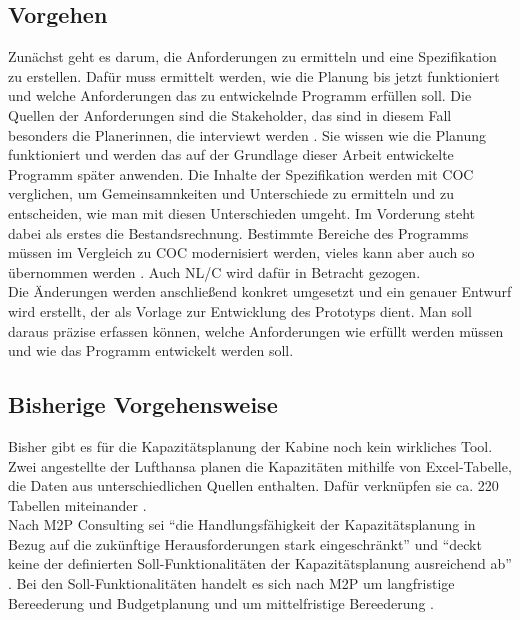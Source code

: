 \documentclass [12pt, a4paper, oneside, titlepage, ngerman]{article}
\begin{document}
\subsection {Vorgehen}
Zunächst geht es darum, die Anforderungen zu ermitteln und eine Spezifikation zu erstellen. Dafür muss ermittelt werden, wie die Planung bis jetzt funktioniert und welche Anforderungen das zu entwickelnde Programm erfüllen soll. Die Quellen der Anforderungen sind die Stakeholder, das sind in diesem Fall besonders die Planerinnen, die interviewt werden . Sie wissen wie die Planung funktioniert und werden das auf der Grundlage dieser Arbeit entwickelte Programm später anwenden. Die Inhalte der Spezifikation werden mit \ac{COC} verglichen, um Gemeinsamnkeiten und Unterschiede zu ermitteln und zu entscheiden, wie man mit diesen  Unterschieden umgeht. Im Vorderung steht dabei als erstes die Bestandsrechnung. Bestimmte Bereiche des Programms müssen im Vergleich zu \ac{COC} modernisiert werden, vieles kann aber auch so übernommen werden \cite[vgl.][]{Gespraech1}. Auch \ac{NL/C} wird dafür in Betracht gezogen. \\
Die Änderungen werden anschließend konkret umgesetzt und ein genauer Entwurf wird erstellt, der als Vorlage zur Entwicklung des Prototyps dient. Man soll daraus präzise erfassen können, welche Anforderungen wie erfüllt werden müssen und wie das Programm entwickelt werden soll.

\subsection{Bisherige Vorgehensweise}
Bisher gibt es für die Kapazitätsplanung der Kabine noch kein wirkliches Tool. Zwei angestellte der Lufthansa planen die Kapazitäten mithilfe von Excel-Tabelle, die Daten aus unterschiedlichen Quellen enthalten. Dafür verknüpfen sie ca. 220 Tabellen miteinander \cite[vgl.][]{Gespraech2}. \\
Nach M2P Consulting sei "`die Handlungsfähigkeit der Kapazitätsplanung in Bezug auf die zukünftige Herausforderungen stark eingeschränkt"' \cite[S.5]{M2P} und "`deckt keine der definierten Soll-Funktionalitäten der Kapazitätsplanung ausreichend ab"' \cite[S.6]{M2P}. Bei den Soll-Funktionalitäten handelt es sich nach M2P um langfristige Bereederung und Budgetplanung und um mittelfristige Bereederung \cite[vgl.][S.6]{M2P}.
\end{document}
